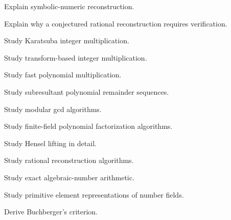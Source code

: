\begin{exercise}[3]
Explain symbolic-numeric reconstruction.
\end{exercise}

\begin{exercise}[3]
Explain why a conjectured rational reconstruction requires verification.
\end{exercise}

\begin{exercise}[4]
Study Karatsuba integer multiplication.
\end{exercise}

\begin{exercise}[4]
Study transform-based integer multiplication.
\end{exercise}

\begin{exercise}[4]
Study fast polynomial multiplication.
\end{exercise}

\begin{exercise}[4]
Study subresultant polynomial remainder sequences.
\end{exercise}

\begin{exercise}[4]
Study modular gcd algorithms.
\end{exercise}

\begin{exercise}[4]
Study finite-field polynomial factorization algorithms.
\end{exercise}

\begin{exercise}[4]
Study Hensel lifting in detail.
\end{exercise}

\begin{exercise}[4]
Study rational reconstruction algorithms.
\end{exercise}

\begin{exercise}[4]
Study exact algebraic-number arithmetic.
\end{exercise}

\begin{exercise}[4]
Study primitive element representations of number fields.
\end{exercise}

\begin{exercise}[4]
Derive Buchberger's criterion.
\end{exercise}

